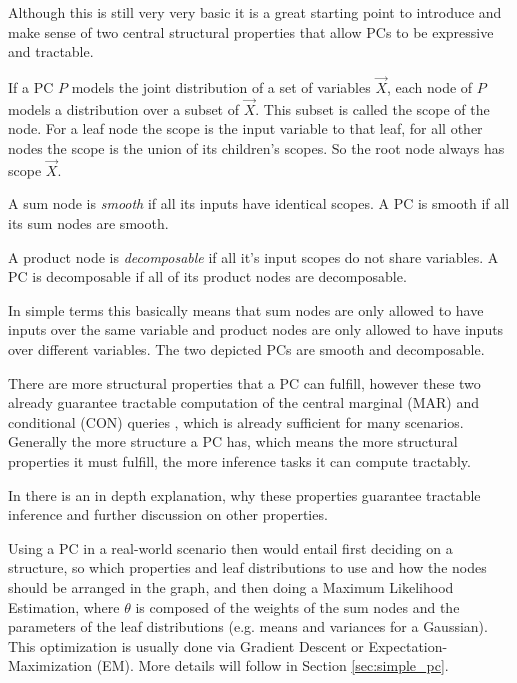 Although this is still very very basic it is a great starting point to introduce and make sense of two central structural 
properties that allow PCs to be expressive and tractable. 

\begin{definition}[Scope]
    If a PC $P$ models the joint distribution of a set of variables $\vec{X}$, each node of $P$ models a distribution over a subset of $\vec{X}$.
    This subset is called the scope of the node. For a leaf node the scope is the input variable to that leaf, for all other nodes the scope 
    is the union of its children's scopes. So the root node always has scope $\vec{X}$. \cite{pc_intro}
\end{definition}

\begin{definition}[Smoothness]
    A sum node is \textit{smooth} if all its inputs have identical scopes. A PC is smooth if all its sum nodes are smooth. \cite{pc_intro}
\end{definition}
\begin{definition}[Decomposability]
    A product node is \textit{decomposable} if all it's input scopes do not share variables. A PC is decomposable if all of its product nodes are decomposable. \cite{pc_intro}
\end{definition}

In simple terms this basically means that sum nodes are only allowed to have inputs over the same variable and product nodes are
only allowed to have inputs over different variables. The two depicted PCs are smooth and decomposable.

There are more structural properties that a PC can fulfill, however these two already guarantee tractable computation of the central
marginal (MAR) and conditional (CON) queries \cite{pc_intro}, which is already sufficient for many scenarios. 
Generally the more structure a PC has, which means the more structural properties it must fulfill, the more inference tasks it can compute 
tractably. 

In \cite{pc_intro} there is an in depth explanation, why these properties guarantee tractable inference 
and further discussion on other properties.

Using a PC in a real-world scenario then would entail first deciding on a structure, so which properties and leaf 
distributions to use and how the nodes should be arranged in the graph, and then doing a Maximum Likelihood 
Estimation, where $\theta$ is composed of the weights of the sum nodes and the parameters of the leaf distributions (e.g. means and variances for a Gaussian). 
This optimization is usually done via Gradient Descent or Expectation-Maximization (EM). More details will follow in Section \ref{sec:simple_pc}.

